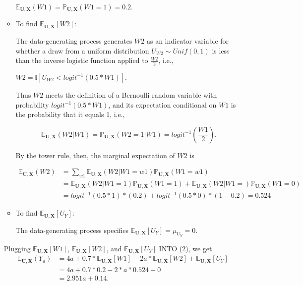 \documentclass{article}\usepackage[]{graphicx}\usepackage[]{xcolor}
\begin{document}
\begin{enumerate}[label=\textbf{\arabic*.}]
\begin{itemize}
      $\mathbb{E}_{\bm{U},\bm{X}}(W1) = \mathbb{P}_{\bm{U},\bm{X}}(W1 = 1) = 0.2$.
      
      \vspace{2mm}
      
        \item To find $\mathbb{E}_{\bm{U},\bm{X}}[W2]$: 
        
        The data-generating process generates $W2$ as an indicator variable for whether a draw from a uniform distribution $U_{W2} \sim Unif(0,1)$ is less than the inverse logistic function applied to $\frac{W2}{2}$, i.e., 
        
      $W2 = \mathbb{I}[U_{W2} < logit^{-1}(0.5*W1)]$.
      
      Thus $W2$ meets the definition of a Bernoulli random variable with probability $logit^{-1}(0.5*W1)$, and its expectation conditional on $W1$ is the probability that it equals 1, i.e.,
      
$$
\mathbb{E}_{\bm{U},\bm{X}}(W2 | W1) = \mathbb{P}_{\bm{U},\bm{X}}(W2 = 1 | W1) = logit^{-1}(\frac{W1}{2}).
$$
      
      By the tower rule, then, the marginal expectation of $W2$ is 
      
\begin{align*}
\mathbb{E}_{\bm{U},\bm{X}}(W2) &= \sum_{w1}\mathbb{E}_{\bm{U},\bm{X}}(W2 | W1 = w1)\mathbb{P}_{\bm{U},\bm{X}}(W1 = w1) \\
&= \mathbb{E}_{\bm{U},\bm{X}}(W2 | W1 = 1)\mathbb{P}_{\bm{U},\bm{X}}(W1 = 1) + \mathbb{E}_{\bm{U},\bm{X}}(W2 | W1 = )\mathbb{P}_{\bm{U},\bm{X}}(W1 = 0) \\
&= logit^{-1}(0.5*1)*(0.2) + logit^{-1}(0.5*0)*(1 - 0.2) = 0.524
\end{align*}
      
      \vspace{2mm}
      
        \item To find $\mathbb{E}_{\bm{U},\bm{X}}[U_Y]$:
        
        The data-generating process specifies $\mathbb{E}_{\bm{U},\bm{X}}[U_Y] = \mu_{U_Y} = 0$.
      
      \end{itemize}
      
      Plugging $\mathbb{E}_{\bm{U},\bm{X}}[W1]$, $\mathbb{E}_{\bm{U},\bm{X}}[W2]$, and $\mathbb{E}_{\bm{U},\bm{X}}[U_Y]$ INTO (2), we get
\begin{align*}
\mathbb{E}_{\bm{U},\bm{X}}(Y_a) &= 4a + 0.7*\mathbb{E}_{\bm{U},\bm{X}}[W1] - 2a*\mathbb{E}_{\bm{U},\bm{X}}[W2] + \mathbb{E}_{\bm{U},\bm{X}}[U_Y] \\
&= 4a + 0.7*0.2 - 2*a*0.524 + 0 \\
&= 2.951a + 0.14.
\end{align*}


\end{enumerate}
\end{document}
